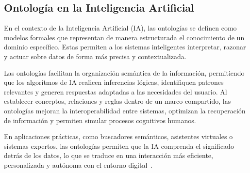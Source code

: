 \subsection{Ontología en la Inteligencia Artificial}

En el contexto de la Inteligencia Artificial (IA), las ontologías se definen
como modelos formales que representan de manera estructurada el conocimiento de
un dominio específico. Estas permiten a los sistemas inteligentes interpretar,
razonar y actuar sobre datos de forma más precisa y
contextualizada.

Las ontologías facilitan la organización semántica de la información,
permitiendo que los algoritmos de IA realicen inferencias lógicas, identifiquen
patrones relevantes y generen respuestas adaptadas a las necesidades del
usuario. Al establecer conceptos, relaciones y reglas dentro de un marco
compartido, las ontologías mejoran la interoperabilidad entre sistemas,
optimizan la recuperación de información y permiten simular procesos cognitivos
humanos.

En aplicaciones prácticas, como buscadores semánticos, asistentes virtuales o
sistemas expertos, las ontologías permiten que la IA comprenda el significado
detrás de los datos, lo que se traduce en una interacción más eficiente,
personalizada y autónoma con el entorno
digital~\parencite{Martin2020OntologiasIA}.
